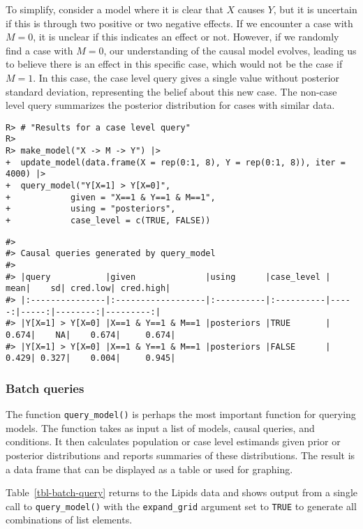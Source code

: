 \documentclass[
  11pt,
  article]{jss}
\begin{document}
To simplify, consider a model where it is clear that \(X\) causes \(Y\),
but it is uncertain if this is through two positive or two negative
effects. If we encounter a case with \(M=0\), it is unclear if this
indicates an effect or not. However, if we randomly find a case with
\(M=0\), our understanding of the causal model evolves, leading us to
believe there is an effect in this specific case, which would not be the
case if \(M=1\). In this case, the case level query gives a single value
without posterior standard deviation, representing the belief about this
new case. The non-case level query summarizes the posterior distribution
for cases with similar data.

\begin{verbatim}
R> # "Results for a case level query"
R> 
R> make_model("X -> M -> Y") |>
+  update_model(data.frame(X = rep(0:1, 8), Y = rep(0:1, 8)), iter = 4000) |>
+  query_model("Y[X=1] > Y[X=0]", 
+            given = "X==1 & Y==1 & M==1", 
+            using = "posteriors",
+            case_level = c(TRUE, FALSE)) 
\end{verbatim}

\begin{verbatim}
#> 
#> Causal queries generated by query_model
#> 
#> |query           |given              |using      |case_level |  mean|    sd| cred.low| cred.high|
#> |:---------------|:------------------|:----------|:----------|-----:|-----:|--------:|---------:|
#> |Y[X=1] > Y[X=0] |X==1 & Y==1 & M==1 |posteriors |TRUE       | 0.674|    NA|    0.674|     0.674|
#> |Y[X=1] > Y[X=0] |X==1 & Y==1 & M==1 |posteriors |FALSE      | 0.429| 0.327|    0.004|     0.945|
\end{verbatim}

\hypertarget{batch-queries}{%
\subsubsection{Batch queries}\label{batch-queries}}

The function \texttt{query\_model()} is perhaps the most important
function for querying models. The function takes as input a list of
models, causal queries, and conditions. It then calculates population or
case level estimands given prior or posterior distributions and reports
summaries of these distributions. The result is a data frame that can be
displayed as a table or used for graphing.

Table~\ref{tbl-batch-query} returns to the Lipids data and shows output
from a single call to \texttt{query\_model()} with the
\texttt{expand\_grid} argument set to \texttt{TRUE} to generate all
combinations of list elements.
\end{document}

